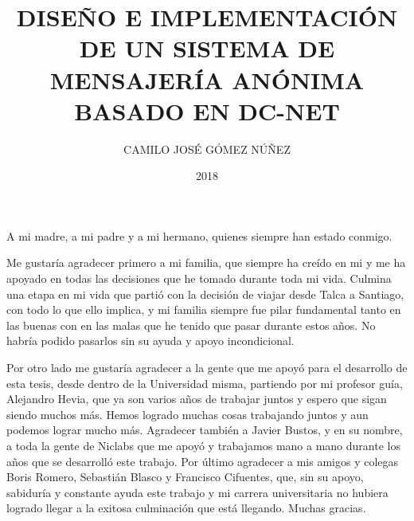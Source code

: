 \documentclass[upright, contnum]{umemoria}
\author{CAMILO JOSÉ GÓMEZ NÚÑEZ}
\title{DISEÑO E IMPLEMENTACIÓN DE UN SISTEMA DE MENSAJERÍA ANÓNIMA BASADO EN DC-NET}
\date{2018}
\begin{document}
\frontmatter
\maketitle

\begin{abstract}

\end{abstract}

\begin{dedicatoria} %
A mi madre, a mi padre y a mi hermano, quienes siempre han estado conmigo.
\end{dedicatoria}

\begin{thanks} %
Me gustaría agradecer primero a mi familia, que siempre ha creído 
en mi y me ha apoyado en todas las decisiones que he tomado durante 
toda mi vida. Culmina una etapa en mi vida que partió con la decisión 
de viajar desde Talca a Santiago, con todo lo que ello implica, y mi 
familia siempre fue pilar fundamental tanto en las buenas con en las 
malas que he tenido que pasar durante estos años. No habría podido 
pasarlos sin su ayuda y apoyo incondicional.

Por otro lado me gustaría agradecer a la gente que me apoyó para el 
desarrollo de esta tesis, desde dentro de la Universidad misma, partiendo 
por mi profesor guía, Alejandro Hevia, que ya son varios años de trabajar 
juntos y espero que sigan siendo muchos más. Hemos logrado muchas 
cosas trabajando juntos y aun podemos lograr mucho más. Agradecer también 
a Javier Bustos, y en su nombre, a toda la gente de Niclabs que me apoyó 
y trabajamos mano a mano durante los años que se desarrolló este trabajo. Por 
último agradecer a mis amigos y colegas Boris Romero, Sebastián Blasco y 
Francisco Cifuentes, que, sin su apoyo, sabiduría y constante ayuda este 
trabajo y mi carrera universitaria no hubiera logrado llegar a la exitosa 
culminación que está llegando. Muchas gracias.
\end{thanks}
\cleardoublepage

\tableofcontents

\mainmatter













\end{document}

